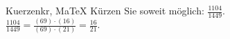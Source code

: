 \begin{MAufgabe}{Kuerzen}{kr, MaTeX}
K\"urzen Sie soweit m\"oglich: $\frac{1104}{1449}$.\\ 
\ifLsg\MLoesung
\quad $\frac{1104}{1449}=\frac{(69)\cdot(16)}{(69)\cdot(21)}=\frac{16}{21}$.\else\relax\fi
 \end{MAufgabe}